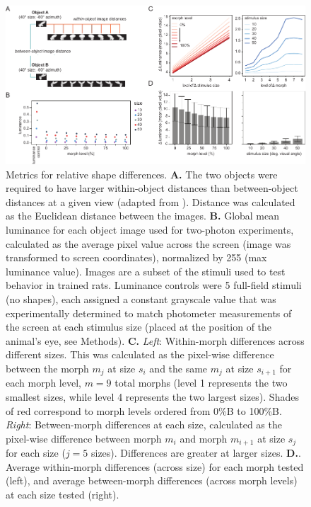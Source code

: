 \begin{figure}[t!]
\includegraphics[width=\textwidth]{figures/supplemental/fig_s4_stimulus_metrics/fig_s4_stimulus_metrics.pdf}
    \centering
    \caption[Stimulus metrics]{Metrics for relative shape differences.
    \textbf{A.} The two objects were required to have larger within-object distances than between-object distances at a given view (adapted from \citet{Zoccolan2009}). Distance was calculated as the Euclidean distance between the images. 
    \textbf{B.} Global mean luminance for each object image used for two-photon experiments, calculated as the average pixel value across the screen (image was transformed to screen coordinates), normalized by 255 (max luminance value). Images are a subset of the stimuli used to test behavior in trained rats. Luminance controls were 5 full-field stimuli (no shapes), each assigned a constant grayscale value that was experimentally determined to match photometer measurements of the screen at each stimulus size (placed at the position of the animal's eye, see Methods). 
    \textbf{C.} \textit{Left}: Within-morph differences across different sizes. This was calculated as the pixel-wise difference between the morph $m_j$ at size $s_i$ and the same $m_j$ at size $s_{i+1}$ for each morph level, $m=9$ total morphs (level 1 represents the two smallest sizes, while level 4 represents the two largest sizes). Shades of red correspond to morph levels ordered from 0\%B to 100\%B. \textit{Right}: Between-morph differences at each size, calculated as the pixel-wise difference between morph $m_i$ and morph $m_{i+1}$ at size $s_j$ for each size ($j=5$ sizes). Differences are greater at larger sizes.
    \textbf{D.}. Average within-morph differences (across size) for each morph tested (left), and average between-morph differences (across morph levels) at each size tested (right).    
    \label{supfig:stimulus_metrics}}
\end{figure}

